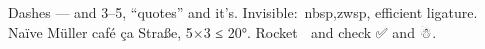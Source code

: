 \documentclass{llncs}
\begin{document}
Dashes — and 3–5, “quotes” and it’s.
Invisible: nbsp,​zwsp, eﬃcient ligature.
Naïve Müller café ça Straße, 5×3 ≤ 20°.
Rocket 🚀 and check ✅ and ☃.
\cite{a}

\end{document}
